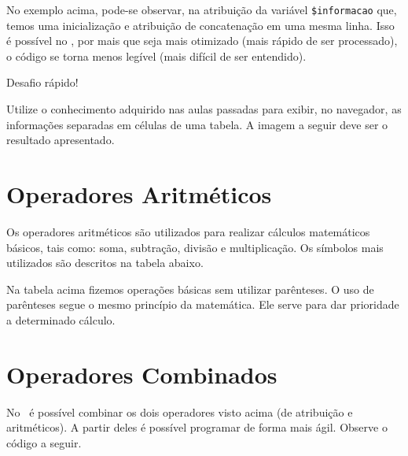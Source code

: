 

No exemplo acima, pode-se observar, na atribuição da variável \texttt{\$informacao} que, 
temos uma inicialização e atribuição de concatenação em uma mesma linha. Isso é possível
no \php, por mais que seja mais otimizado (mais rápido de ser processado), o código se
torna menos legível (mais difícil de ser entendido).

\begin{framed}
{\Large Desafio rápido!}

Utilize o conhecimento adquirido nas aulas passadas para exibir, no navegador, as informações
separadas em células de uma tabela. A imagem a seguir deve ser o resultado apresentado. 

\end{framed}

\section{Operadores Aritméticos}
\label{operadores-aritmeticos}

Os operadores aritméticos são utilizados para realizar cálculos matemáticos básicos, tais
como: soma, subtração, divisão e multiplicação. Os símbolos mais utilizados são descritos
na tabela abaixo.



Na tabela acima fizemos operações básicas sem utilizar parênteses. O uso de parênteses
segue o mesmo princípio da matemática. Ele serve para dar prioridade a determinado
cálculo.

\section{Operadores Combinados}
\label{operadores-combinados}

No \php~é possível combinar os dois operadores visto acima (de atribuição e aritméticos).
A partir deles é possível programar de forma mais ágil. Observe o código a seguir.

\begin{multicols}{2}

  
  \columnbreak

  

\end{multicols}

